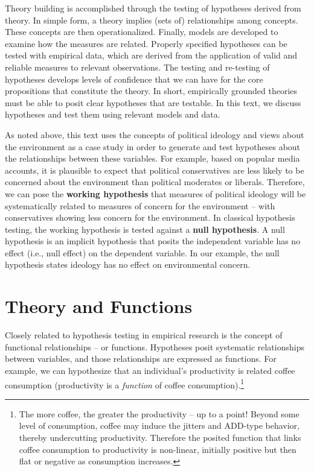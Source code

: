\documentclass[11pt,openany]{book}\usepackage[]{graphicx}\usepackage[]{color}
\begin{document}
Theory building is accomplished through the testing of hypotheses derived from theory. In simple form, a theory implies (sets of) relationships
among concepts. These concepts are then operationalized. Finally, models are developed to examine how the measures are related. Properly specified
hypotheses can be tested with empirical data, which are derived from the application  of valid and reliable measures to relevant observations. The testing and re-testing of hypotheses develops levels of confidence that we can have for the core propositions that constitute the theory. In short, empirically grounded theories must be able to posit clear hypotheses that are testable. In this text, we discuss hypotheses and test them using relevant models and data. 

As noted above, this text uses the concepts of political ideology and views about the environment as a case study in order to generate and test hypotheses about the relationships between these variables. For example, based on popular media accounts, it is plausible to expect that political
conservatives are less likely to be concerned about the environment than political moderates or liberals. Therefore, we can pose the \textbf{working hypothesis} that measures of political ideology will be systematically related to measures of concern for the environment -- with conservatives showing less concern for the environment. In classical hypothesis testing, the working hypothesis is tested against a \textbf{null hypothesis}. A null hypothesis is an implicit hypothesis that posits the independent variable has no effect (i.e., null effect) on the dependent variable. In our example, the null hypothesis states ideology has no effect on environmental concern.  

\section{Theory and Functions}

Closely related to hypothesis testing in empirical research is the concept of functional relationships -- or functions. Hypotheses posit systematic relationships between variables, and those relationships are expressed as functions. For example, we can hypothesize that an individual's productivity is related coffee consumption (productivity is a \textit{function} of coffee consumption).\footnote{The more coffee, the greater the productivity -- up to a point! Beyond some level of consumption, coffee may induce the jitters and ADD-type behavior, thereby undercutting productivity. Therefore the posited function that links coffee consumption to productivity is non-linear, initially positive but then flat or negative as consumption increases.} 
\end{document}
